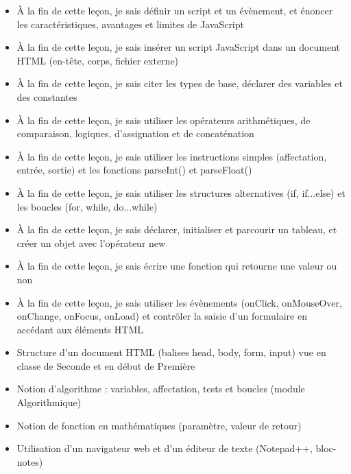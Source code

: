 \documentclass[11pt]{article}
\begin{document}
\begin{objectifs}
\begin{itemize}
\item À la fin de cette leçon, je sais définir un script et un évènement, et énoncer les caractéristiques, avantages et limites de JavaScript
\item À la fin de cette leçon, je sais insérer un script JavaScript dans un document HTML (en-tête, corps, fichier externe)
\item À la fin de cette leçon, je sais citer les types de base, déclarer des variables et des constantes
\item À la fin de cette leçon, je sais utiliser les opérateurs arithmétiques, de comparaison, logiques, d'assignation et de concaténation
\item À la fin de cette leçon, je sais utiliser les instructions simples (affectation, entrée, sortie) et les fonctions parseInt() et parseFloat()
\item À la fin de cette leçon, je sais utiliser les structures alternatives (if, if...else) et les boucles (for, while, do...while)
\item À la fin de cette leçon, je sais déclarer, initialiser et parcourir un tableau, et créer un objet avec l'opérateur new
\item À la fin de cette leçon, je sais écrire une fonction qui retourne une valeur ou non
\item À la fin de cette leçon, je sais utiliser les évènements (onClick, onMouseOver, onChange, onFocus, onLoad) et contrôler la saisie d'un formulaire en accédant aux éléments HTML
\end{itemize}
\end{objectifs}

\begin{prerequis}
\begin{itemize}
\item Structure d'un document HTML (balises head, body, form, input) vue en classe de Seconde et en début de Première
\item Notion d'algorithme : variables, affectation, tests et boucles (module Algorithmique)
\item Notion de fonction en mathématiques (paramètre, valeur de retour)
\item Utilisation d'un navigateur web et d'un éditeur de texte (Notepad++, bloc-notes)
\end{itemize}
\end{prerequis}
\end{document}
